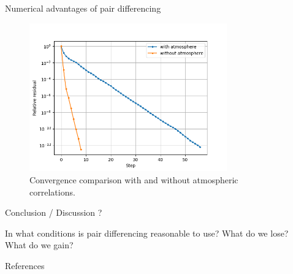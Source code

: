 \documentclass[final]{beamer}
\newlength{\sepwidth}
\newlength{\colwidth}
\newcommand{\separatorcolumn}{\begin{column}{\sepwidth}\end{column}}
\begin{document}
\begin{frame}[t]
\begin{columns}[t]
\begin{column}{\colwidth}
\begin{exampleblock}{Numerical advantages of pair differencing}
        \begin{figure}
          \centering
          \includegraphics[width=0.8\textwidth]{figures/convergence.png}
          \caption{Convergence comparison with and without atmospheric correlations.}
        \end{figure}

      \end{exampleblock}

      \begin{block}{Conclusion / Discussion ?}

        In what conditions is pair differencing reasonable to use?
        What do we lose? What do we gain?

      \end{block}

      \begin{block}{References}

        \nocite{*}
        \footnotesize{}

      \end{block}

    \end{column}

    \separatorcolumn
  \end{columns}
\end{frame}
\end{document}
